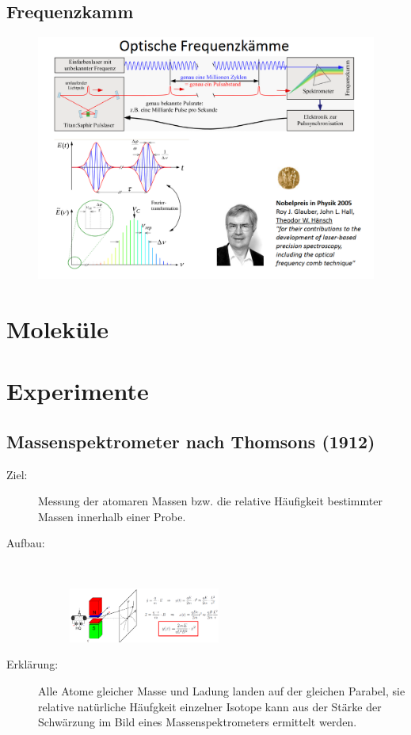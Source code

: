 \documentclass[twocolumn]{summery_4.1}
\begin{document}
\subsection{Frequenzkamm}
\begin{figure}[H]
    \centering
    \includegraphics[width=.49\textwidth]{Frequenzkamm.png}
\end{figure}

\section{Moleküle}

\section{Experimente}

\subsection{Massenspektrometer nach Thomsons (1912)}
\begin{description}
    \item[Ziel:] Messung der atomaren Massen bzw. die relative Häufigkeit bestimmter Massen innerhalb einer Probe.
    
    \item[Aufbau:]\,

    \begin{figure}[H]
        \centering
        \includegraphics[width=0.49\textwidth]{massenspektrometer_nach_thomson.png}
    \end{figure}
    
    \item[Erklärung:]
    Alle Atome gleicher Masse und Ladung landen auf der gleichen Parabel, sie relative natürliche Häufgkeit einzelner Isotope kann aus der Stärke der Schwärzung im Bild eines Massenspektrometers ermittelt werden.
\end{description}
\end{document}
